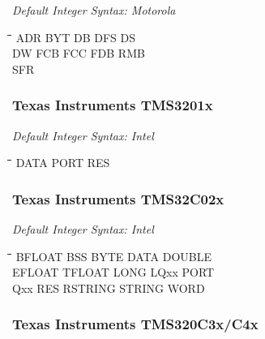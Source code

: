 {\em Default Integer Syntax: Motorola}

{\tt\begin{tabbing}
\hspace{3cm}\=\hspace{3cm}\=\hspace{3cm}\=\hspace{3cm}\=\kill
ADR        \> BYT         \> DB          \> DFS         \> DS \\
DW         \> FCB         \> FCC         \> FDB         \> RMB \\
SFR \\
\end{tabbing}}

\subsubsection{Texas Instruments TMS3201x}

{\em Default Integer Syntax: Intel}

{\tt\begin{tabbing}
\hspace{3cm}\=\hspace{3cm}\=\hspace{3cm}\=\hspace{3cm}\=\kill
DATA       \> PORT        \> RES \\
\end{tabbing}}

\subsubsection{Texas Instruments TMS32C02x}

{\em Default Integer Syntax: Intel}

{\tt\begin{tabbing}
\hspace{3cm}\=\hspace{3cm}\=\hspace{3cm}\=\hspace{3cm}\=\kill
BFLOAT     \> BSS         \> BYTE        \> DATA        \> DOUBLE \\ 
EFLOAT     \> TFLOAT      \> LONG        \> LQxx        \> PORT \\
Qxx        \> RES         \> RSTRING     \> STRING      \> WORD \\
\end{tabbing}}

\subsubsection{Texas Instruments TMS320C3x/C4x}

